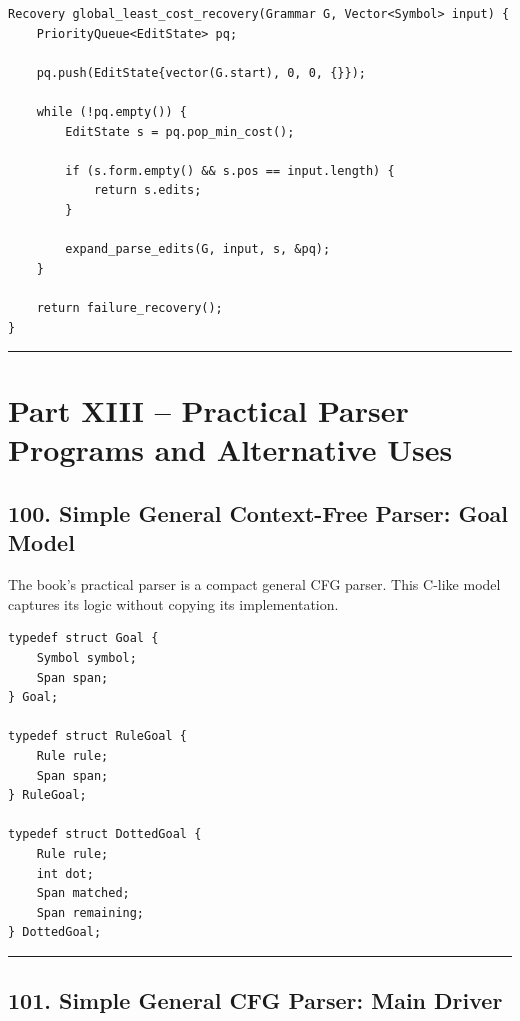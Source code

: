 \documentclass[10pt,letterpaper]{article}
\begin{document}
\begin{verbatim}
Recovery global_least_cost_recovery(Grammar G, Vector<Symbol> input) {
    PriorityQueue<EditState> pq;

    pq.push(EditState{vector(G.start), 0, 0, {}});

    while (!pq.empty()) {
        EditState s = pq.pop_min_cost();

        if (s.form.empty() && s.pos == input.length) {
            return s.edits;
        }

        expand_parse_edits(G, input, s, &pq);
    }

    return failure_recovery();
}
\end{verbatim}

\medskip\hrule\medskip

\clearpage
\section*{Part XIII -- Practical Parser Programs and Alternative Uses}

\subsection*{100. Simple General Context-Free Parser: Goal Model}

The book's practical parser is a compact general CFG parser. This C-like model captures its logic without copying its implementation.

\begin{verbatim}
typedef struct Goal {
    Symbol symbol;
    Span span;
} Goal;

typedef struct RuleGoal {
    Rule rule;
    Span span;
} RuleGoal;

typedef struct DottedGoal {
    Rule rule;
    int dot;
    Span matched;
    Span remaining;
} DottedGoal;
\end{verbatim}

\medskip\hrule\medskip

\subsection*{101. Simple General CFG Parser: Main Driver}
\end{document}
